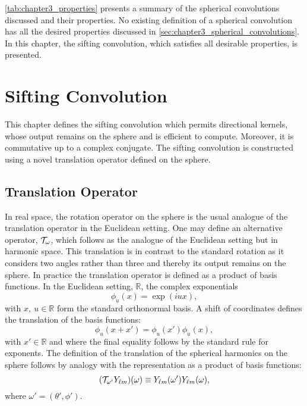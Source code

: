 \cref{tab:chapter3_properties} presents a summary of the spherical convolutions discussed and their properties.
No existing definition of a spherical convolution has all the desired properties discussed in \cref{sec:chapter3_spherical_convolutions}.
In this chapter, the sifting convolution, which satisfies all desirable properties, is presented.



\section{Sifting Convolution}\label{sec:chapter3_sifting_convolution}

This chapter defines the sifting convolution which permits directional kernels, whose output remains on the sphere and is efficient to compute.
Moreover, it is commutative up to a complex conjugate.
The sifting convolution is constructed using a novel translation operator defined on the sphere.

\subsection{Translation Operator}\label{sec:chapter3_translation_operator}

In real space, the rotation operator on the sphere is the usual analogue of the translation operator in the Euclidean setting.
One may define an alternative operator, \(\translation{\omega}\), which follows as the analogue of the Euclidean setting but in harmonic space.
This translation is in contrast to the standard rotation as it considers two angles rather than three and thereby its output remains on the sphere.
In practice the translation operator is defined as a product of basis functions.
In the Euclidean setting, \eg{} \(\mathbb{R}\), the complex exponentials
%
\begin{equation}
	\phi_{u}(x)
	= \exp(i u x),
\end{equation}
%
with \(x,\ u \in \mathbb{R}\) form the standard orthonormal basis.
A shift of coordinates defines the translation of the basis functions:
%
\begin{equation}
	\phi_{u}(x + x')
	= \phi_{u}(x') \phi_{u}(x),
\end{equation}
%
with \(x' \in \mathbb{R}\) and where the final equality follows by the standard rule for exponents.
The definition of the translation of the spherical harmonics on the sphere follows by analogy with the representation as a product of basis functions:
%
\begin{equation}\label{eq:chapter3_translation_basis_functions}
	\pixel{(\translation{\omega'}\harmonic{Y})}
	\equiv \pixel[']{\harmonic{Y}} \pixel{\harmonic{Y}},
\end{equation}
%
where \(\omega'=(\theta',\phi')\).

